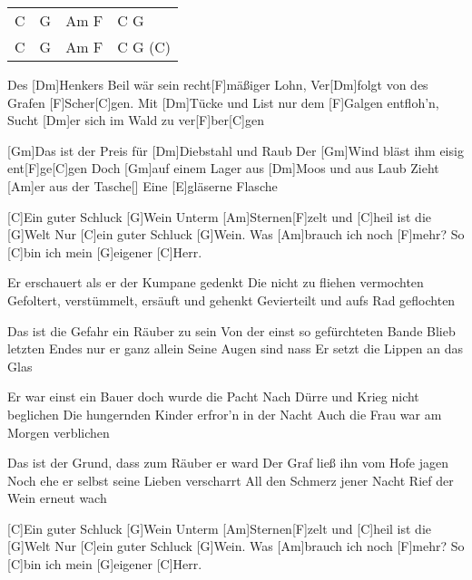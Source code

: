 

\begin{guitar}
	 {\footnotesize\begin{tabular}{l|l|l|l}
			C & G & Am F & C G \\
			C & G & Am F & C G (C) 
	\end{tabular}}

	Des [Dm]Henkers Beil wär sein recht[F]mäßiger Lohn,
	Ver[Dm]folgt von des Grafen [F]Scher[C]gen.
	Mit [Dm]Tücke und List nur dem [F]Galgen entfloh'n,
	Sucht [Dm]er sich im Wald zu ver[F]ber[C]gen
	
	[Gm]Das ist der Preis für [Dm]Diebstahl und Raub
	Der [Gm]Wind bläst ihm eisig ent[F]ge[C]gen
	Doch [Gm]auf einem Lager aus [Dm]Moos und aus Laub
	Zieht [Am]er aus der Tasche[]{}
	Eine [E]gläserne Flasche
	
	[C]Ein guter Schluck [G]Wein
	Unterm [Am]Sternen[F]zelt und [C]heil ist die [G]Welt
	Nur [C]ein guter Schluck [G]Wein.
	Was [Am]brauch ich noch [F]mehr? So [C]bin ich mein [G]eigener [C]Herr.

	Er erschauert als er der Kumpane gedenkt
	Die nicht zu fliehen vermochten
	Gefoltert, verstümmelt, ersäuft und gehenkt
	Gevierteilt und aufs Rad geflochten

	Das ist die Gefahr ein Räuber zu sein
	Von der einst so gefürchteten Bande
	Blieb letzten Endes nur er ganz allein
	Seine Augen sind nass
	Er setzt die Lippen an das Glas
	
	 
	
	\pagebreak
	Er war einst ein Bauer doch wurde die Pacht
	Nach Dürre und Krieg nicht beglichen
	Die hungernden Kinder erfror'n in der Nacht
	Auch die Frau war am Morgen verblichen

	Das ist der Grund, dass zum Räuber er ward
	Der Graf ließ ihn vom Hofe jagen
	Noch ehe er selbst seine Lieben verscharrt
	All den Schmerz jener Nacht
	Rief der Wein erneut wach
	
	[C]Ein guter Schluck [G]Wein
	Unterm [Am]Sternen[F]zelt und [C]heil ist die [G]Welt
	Nur [C]ein guter Schluck [G]Wein.
	Was [Am]brauch ich noch [F]mehr? So [C]bin ich mein [G]eigener [C]Herr.


\end{guitar}
